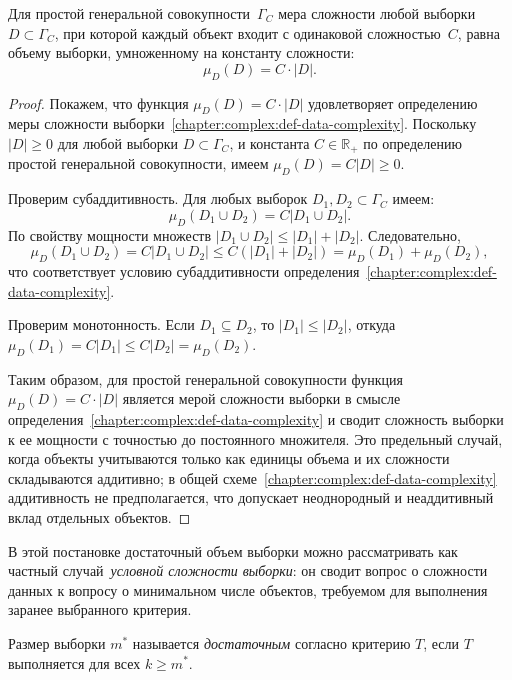 \begin{corollary}
    Для простой генеральной совокупности~$\Gamma_C$ мера сложности любой выборки $D \subset \Gamma_C$, при которой каждый объект входит с одинаковой сложностью~$C$, равна объему выборки, умноженному на константу сложности:
    \[
        \mu_D(D) = C\cdot|D|.
    \]
\end{corollary}
\begin{proof}
    Покажем, что функция $\mu_D(D) = C \cdot |D|$ удовлетворяет определению меры сложности выборки~\ref{chapter:complex:def-data-complexity}. Поскольку $|D| \geq 0$ для любой выборки $D \subset \Gamma_C$, и константа $C \in \mathbb{R}_+$ по определению простой генеральной совокупности, имеем $\mu_D(D) = C|D| \geq 0$.

    Проверим субаддитивность. Для любых выборок $D_1, D_2 \subset \Gamma_C$ имеем:
    \[
        \mu_D(D_1 \cup D_2) = C|D_1 \cup D_2|.
    \]
    По свойству мощности множеств $|D_1 \cup D_2| \leq |D_1| + |D_2|$. Следовательно,
    \[
        \mu_D(D_1 \cup D_2) = C|D_1 \cup D_2| \leq C(|D_1| + |D_2|) = \mu_D(D_1) + \mu_D(D_2),
    \]
    что соответствует условию субаддитивности определения~\ref{chapter:complex:def-data-complexity}.

    Проверим монотонность. Если $D_1 \subseteq D_2$, то $|D_1| \leq |D_2|$, откуда $\mu_D(D_1) = C|D_1| \leq C|D_2| = \mu_D(D_2)$.

    Таким образом, для простой генеральной совокупности функция $\mu_D(D) = C \cdot |D|$ является мерой сложности выборки в смысле определения~\ref{chapter:complex:def-data-complexity} и сводит сложность выборки к ее мощности с точностью до постоянного множителя. Это предельный случай, когда объекты учитываются только как единицы объема и их сложности складываются аддитивно; в общей схеме~\ref{chapter:complex:def-data-complexity} аддитивность не предполагается, что допускает неоднородный и неаддитивный вклад отдельных объектов.
\end{proof}

В этой постановке достаточный объем выборки можно рассматривать как частный случай~\textit{условной сложности выборки}: он сводит вопрос о сложности данных к вопросу о минимальном числе объектов, требуемом для выполнения заранее выбранного критерия.

\begin{definition}
    Размер выборки $m^*$ называется \textit{достаточным} согласно критерию $T$, если $T$ выполняется для всех $k \geqslant m^*$.
\end{definition}

